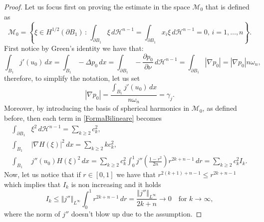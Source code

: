 \documentclass[oneside,a4paper,11pt,notitlepage]{article}
\newcommand{\abs}[1]{{\left|#1\right|}}
\newcommand{\norma}[1]{{\left\Vert#1\right\Vert}}
\newcommand{\dH}{\,d\mathcal{H}^{n-1}}
\newcommand{\nd}[1]{\frac{\partial#1}{\partial\nu}}
\theoremstyle{definition}
\theoremstyle{plain}
\theoremstyle{definition}
\begin{document}
\begin{proof}
    Let us focus first on proving the estimate in the space $\mathcal{M}_0$ that is defined as
    \begin{equation*}
        \mathcal{M}_0=\left\{\xi\in H^{1/2}(\partial B_1)\,:\, \int_{\partial B_1}\xi\,d\mathcal{H}^{n-1}=\int_{\partial B_1}x_i\xi\,d\mathcal{H}^{n-1}=0,\, i=1,\dots,n \right\}.
    \end{equation*}
    First notice by Green's identity we have that:
    \begin{equation*}
        \int_{B_1}j'(u_0)\,dx=\int_{B_1}-\Delta p_0\,dx=\int_{\partial B_1}-\nd{p_0}\dH=\int_{\partial B_1}\abs{\nabla p_0}=\abs{\nabla p_0}n\omega_n,
    \end{equation*}
    therefore, to simplify the notation, let us set
    \begin{equation*}
    \abs{\nabla p_0}=\frac{\int_{B_1}j'(u_0)\,dx}{n\omega_n}=\gamma_j.
    \end{equation*}
    Moreover, by introducing the basis of spherical harmonics in $\mathcal{M}_0$, as defined before, then each term in \eqref{FormaBilineare} becomes
    \begin{equation*}
        \begin{split}
            \int_{\partial B_1}&\xi^2\dH=\sum_{k\geq2}c_k^2,\\
            \int_{B_1}&\abs{\nabla H(\xi)}^2\,dx=\sum_{k\geq2}kc_k^2,\\
            \int_{B_1}&j''(u_0)H(\xi)^2\,dx=\sum_{k\geq2}c_k^2
            \int_0^1 j''\left(\frac{1-r^2}{2n}\right)r^{2k+n-1}\,dr=\sum_{k\geq2}c_k^2I_k.
        \end{split}
    \end{equation*}
    Now, let us notice that if $r\in[0,1]$ we have that $r^{2(k+1)+n-1}\leq r^{2k+n-1}$ which implies that $I_k$ is non increasing and it holds
    \begin{equation*}
        I_k\leq\norma{j''}_{L^\infty}\int_0^1r^{2k+n-1}\,dr=\frac{\norma{j''}_{L^\infty}}{2k+n}\rightarrow0\quad\text{for }k\rightarrow\infty,
    \end{equation*}
    where the norm of $j''$ doesn't blow up due to the assumption.
    

\end{proof}
\end{document}

